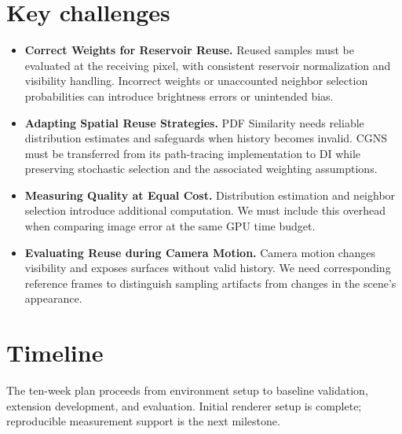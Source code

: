 \documentclass[a4paper]{article}
\begin{document}
\section*{Key challenges}
\begin{itemize}
\item \textbf{Correct Weights for Reservoir Reuse.} Reused samples must be evaluated at the receiving pixel, with consistent reservoir normalization and visibility handling. Incorrect weights or unaccounted neighbor selection probabilities can introduce brightness errors or unintended bias.
\item \textbf{Adapting Spatial Reuse Strategies.} PDF Similarity needs reliable distribution estimates and safeguards when history becomes invalid. CGNS must be transferred from its path-tracing implementation to DI while preserving stochastic selection and the associated weighting assumptions.
\item \textbf{Measuring Quality at Equal Cost.} Distribution estimation and neighbor selection introduce additional computation. We must include this overhead when comparing image error at the same GPU time budget.
\item \textbf{Evaluating Reuse during Camera Motion.} Camera motion changes visibility and exposes surfaces without valid history. We need corresponding reference frames to distinguish sampling artifacts from changes in the scene's appearance.
\end{itemize}

\section*{Timeline}
The ten-week plan proceeds from environment setup to baseline validation, extension development, and evaluation. Initial renderer setup is complete; reproducible measurement support is the next milestone.
\end{document}

